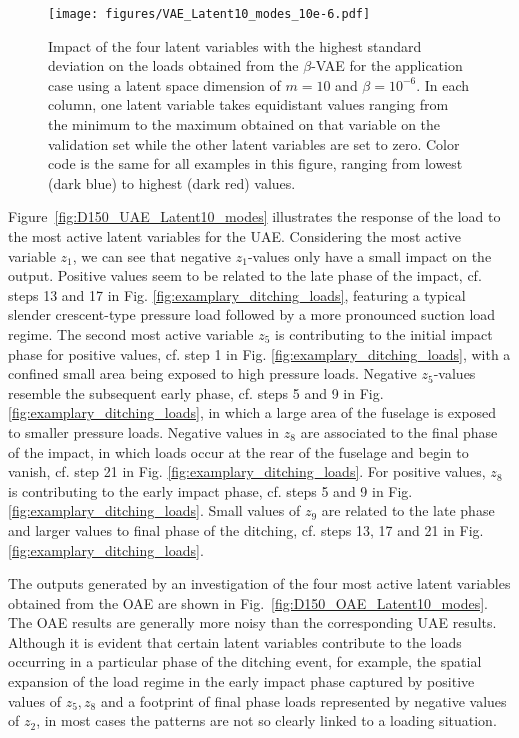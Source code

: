 \begin{figure}[h!]
    \centering
    \texttt{[image: figures/VAE\_Latent10\_modes\_10e-6.pdf]}
    \caption{Impact of the four latent variables with the highest standard deviation on the loads obtained from the $\beta$-VAE for the application case using a latent space dimension of $m=10$ and $\beta=10^{-6}$. 
    In each column, one latent variable takes equidistant values ranging from the minimum to the maximum obtained on that variable on the validation set while the other latent variables are set to zero.
    Color code is the same for all examples in this figure, ranging from lowest (dark blue) to highest (dark red) values.}
    \label{fig:D150_VAE_Latent10_modes}
\end{figure}

Figure~\ref{fig:D150_UAE_Latent10_modes} illustrates the response of the load to the most 
active latent variables for the UAE. 
Considering the most active variable $z_1$, we can see that negative $z_1$-values only have a small impact on the output. Positive values seem to be related to the late phase of the impact, cf. steps 13 and 17 in Fig. \ref{fig:examplary_ditching_loads}, featuring a typical slender crescent-type  pressure load followed by a more pronounced suction load regime.
The second most active variable $z_5$ is contributing to the initial impact phase for positive values, cf. step 1 in Fig. \ref{fig:examplary_ditching_loads}, with a confined small area being exposed to high pressure loads. Negative $z_5$-values resemble the subsequent early phase, cf. steps 5 and 9 in Fig. \ref{fig:examplary_ditching_loads}, in which a large area of the fuselage is exposed to smaller pressure loads. 
Negative values in $z_8$ are associated to the final phase of the impact, in which  loads occur at the rear of the fuselage and begin to vanish, cf. step 21 in Fig. \ref{fig:examplary_ditching_loads}. For positive values, $z_8$ is contributing to the early impact phase, cf. steps 5 and 9 in Fig. \ref{fig:examplary_ditching_loads}. Small values of $z_9$ are related to the late phase and larger values to final phase of the ditching, cf. steps 13, 17 and 21 in Fig. \ref{fig:examplary_ditching_loads}.

The outputs generated by an investigation of the four most active latent variables obtained from the OAE are shown in Fig.~\ref{fig:D150_OAE_Latent10_modes}. The OAE results are generally more noisy than the corresponding UAE results. 
%
Although it is evident that certain latent variables contribute to the loads occurring in a particular phase of the ditching event,
for example, the spatial expansion of the load regime in the early impact phase captured by positive values of $z_5, z_8$ and a footprint of final phase loads represented by negative values of $z_2$, in most cases the patterns are not so clearly linked to a loading situation.


